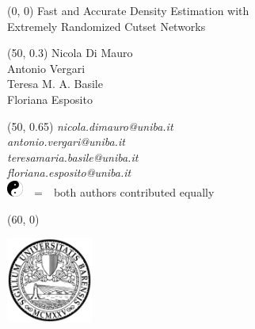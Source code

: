 \documentclass[final]{beamer}
\begin{document}
\begin{frame}{}
  \begin{textblock}{78}(0, 0)
    \Huge
    Fast and Accurate Density Estimation with\\
    Extremely Randomized Cutset Networks
  \end{textblock}
  \begin{textblock}{40}(50, 0.3)
    \small
    Nicola {Di Mauro}{}\\[10pt]
    Antonio Vergari{}\\[10pt]
    Teresa M. A. Basile\\[10pt]
    Floriana Esposito\\
  \end{textblock}
  \begin{textblock}{8}(50, 0.65)
    \scriptsize
    \flushright
    \emph{nicola.dimauro@uniba.it}\\[19pt]
    \emph{antonio.vergari@uniba.it}\\[17pt]
    \emph{teresamaria.basile@uniba.it}\\[17pt]
    \emph{floriana.esposito@uniba.it}\\[10pt]
    {\flushleft\scriptsize\includegraphics[width=15pt]{yinyang}\ \ =\ \ both authors contributed equally}
  \end{textblock}
    \begin{textblock}{30}(60, 0)
    \scriptsize
    \begin{minipage}[t]{20cm}
      \vspace{0pt}\hspace{15pt}
      \includegraphics[width=80pt]{figures/unibaba}

\end{minipage}
\end{textblock}
\end{frame}
\end{document}
